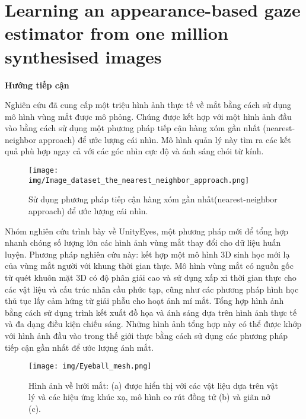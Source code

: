 \section{Learning an appearance-based gaze estimator from one million synthesised images \cite{Learninganappearancebasedgazeestimator}}

\textbf{Hướng tiếp cận}

Nghiên cứu đã cung cấp một triệu hình ảnh thực tế về mắt bằng cách sử dụng mô hình vùng mắt được mô phỏng. Chúng được kết hợp với một hình ảnh đầu vào bằng cách sử dụng một phương pháp tiếp cận hàng xóm gần nhất (nearest-neighbor approach) để ước lượng cái nhìn. Mô hình quản lý này tìm ra các kết quả phù hợp ngay cả với các góc nhìn cực độ và ánh sáng chói từ kính.

\begin{center}
    \begin{figure}[h!]
    \begin{center}
     \texttt{[image: img/Image\_dataset\_the\_nearest\_neighbor\_approach.png]}
    \end{center}
    \caption{Sử dụng phương pháp tiếp cận hàng xóm gần nhất(nearest-neighbor approach) để ước lượng cái nhìn.}
    \label{refhinh15}
    \end{figure}
\end{center}

Nhóm nghiên cứu trình bày về UnityEyes, một phương pháp mới để tổng hợp nhanh chóng số lượng lớn các hình ảnh vùng mắt thay đổi cho dữ liệu huấn luyện. Phương pháp nghiên cứu này: kết hợp một mô hình 3D sinh học mới lạ của vùng mắt người với khung thời gian thực. Mô hình vùng mắt có nguồn gốc từ quét khuôn mặt 3D có độ phân giải cao và sử dụng xấp xỉ thời gian thực cho các vật liệu và cấu trúc nhãn cầu phức tạp, cũng như các phương pháp hình học thủ tục lấy cảm hứng từ giải phẫu cho hoạt ảnh mí mắt. Tổng hợp hình ảnh bằng cách sử dụng trình kết xuất đồ họa và ánh sáng dựa trên hình ảnh thực tế và đa dạng điều kiện chiếu sáng. Những hình ảnh tổng hợp này có thể được khớp với hình ảnh đầu vào trong thế giới thực bằng cách sử dụng các phương pháp tiếp cận gần nhất để ước lượng ánh mắt. 

\begin{center}
    \begin{figure}[h!]
    \begin{center}
     \texttt{[image: img/Eyeball\_mesh.png]}
    \end{center}
    \caption{Hình ảnh về lưới mắt: (a) được hiển thị với các vật liệu dựa trên vật lý và các hiệu ứng khúc xạ, mô hình co rút đồng tử (b) và giãn nở (c).}
    \label{refhinh15}
    \end{figure}
\end{center}

